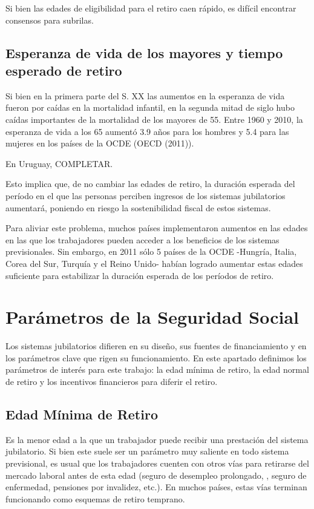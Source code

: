 \documentclass[]{article}
\begin{document}
Si bien las edades de eligibilidad para el retiro caen rápido, es
difícil encontrar consensos para subrilas.

\subsection{Esperanza de vida de los mayores y tiempo esperado de
retiro}\label{esperanza-de-vida-de-los-mayores-y-tiempo-esperado-de-retiro}

Si bien en la primera parte del S. XX las aumentos en la esperanza de
vida fueron por caídas en la mortalidad infantil, en la segunda mitad de
siglo hubo caídas importantes de la mortalidad de los mayores de 55.
Entre 1960 y 2010, la esperanza de vida a los 65 aumentó 3.9 años para
los hombres y 5.4 para las mujeres en los países de la OCDE (OECD
(2011)).

En Uruguay, COMPLETAR.

Esto implica que, de no cambiar las edades de retiro, la duración
esperada del período en el que las personas perciben ingresos de los
sistemas jubilatorios aumentará, poniendo en riesgo la sostenibilidad
fiscal de estos sistemas.

Para aliviar este problema, muchos países implementaron aumentos en las
edades en las que los trabajadores pueden acceder a los beneficios de
los sistemas previsionales. Sin embargo, en 2011 sólo 5 países de la
OCDE -Hungría, Italia, Corea del Sur, Turquía y el Reino Unido- habían
logrado aumentar estas edades suficiente para estabilizar la duración
esperada de los períodos de retiro.

\section{Parámetros de la Seguridad
Social}\label{parametros-de-la-seguridad-social}

Los sistemas jubilatorios difieren en su diseño, sus fuentes de
financiamiento y en los parámetros clave que rigen su funcionamiento. En
este apartado definimos los parámetros de interés para este trabajo: la
edad mínima de retiro, la edad normal de retiro y los incentivos
financieros para diferir el retiro.

\subsection{Edad Mínima de Retiro}\label{edad-minima-de-retiro}

Es la menor edad a la que un trabajador puede recibir una prestación del
sistema jubilatorio. Si bien este suele ser un parámetro muy saliente en
todo sistema previsional, es usual que los trabajadores cuenten con
otros vías para retirarse del mercado laboral antes de esta edad (seguro
de desempleo prolongado, , seguro de enfermedad, pensiones por
invalidez, etc.). En muchos países, estas vías terminan funcionando como
esquemas de retiro temprano.
\end{document}
